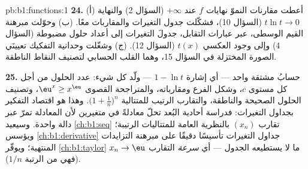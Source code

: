 \begin{solution}{pb:b1:functions:1}
\textbf{24.} (أ) أعطت مقارنات النموّ نهايات $f$ عند
$+\infty$ (السؤال 2) والنهاية $t\ln t \to 0$ (السؤال 10)،
فشكّلت جدول التغيرات والمقاربات معًا. (ب) وحوّلت
مبرهنة القيم الوسطى، عبر عبارات التقابل،
جدولَ التغيرات إلى أعداد حلول مضبوطة
(السؤال 4) وإلى وجود  العكسي $t(x)$
(السؤال 12). (ج) وشغّلت وحدانية التفكيك تعيينَي
الصورة المختزلة في السؤال 15، وهما القلب الحسابي
لتصنيف النقاط الناطقة.

\textbf{25.} حسابُ مشتقة واحد --- أي إشارة $1 - \ln
t$ --- ولّد كل شيء: عدد الحلول من أجل كل مستوى
$c$، وشكل الفرع ومقارباته، والمتراجحة
القصوى $\eu^x \geq x^\eu$، وتصنيف الحلول الصحيحة
والناطقة، والتقارب الرتيب للمتتالية $\bigl(1 +
\frac1n\bigr)^n$. وهذا هو اقتصاد التفكير بجداول
التغيرات: فدراسة أحادية البُعد تحلّ معادلةً في متغيرين
لأن المعادلة تمرّ عبر دالة واحدة.
وسيعيد \cref{ch:b1:seq} تقارب $(x_n)$ بالنظرية
العامة للمتتاليات الرتيبة؛ ويؤسس \cref{ch:b1:derivative}
جداول التغيرات تأسيسًا دقيقًا على مبرهنة التزايدات المنتهية؛
ويوفّر \cref{ch:b1:taylor} ما لا يستطيعه الجدول --- أي
\emph{سرعة} التقارب $x_n \to \eu$ (فهي من الرتبة
$1/n$).
\end{solution}
